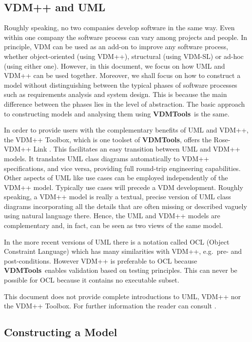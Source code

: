 \documentclass[\pformat,12pt,twoside]{article}
\newcommand{\vdmtools}{\textbf{VDMTools}}
\begin{document}
\subsection{VDM++ and UML}

Roughly speaking, no two companies develop software in the same 
way. Even within one company the software process can vary among 
projects and people. In principle, VDM can be used as an add-on 
to improve any software process, whether object-oriented (using 
VDM++), structural (using VDM-SL) or ad-hoc (using either one). 
However, in this document, we focus on how UML and VDM++ can 
be used together. Moreover, we shall focus on how to construct 
a model without distinguishing between the typical phases of 
software processes such as requirements analysis and system design. 
This is because the main difference between the phases lies in 
the level of abstraction. The basic approach to constructing 
models and analysing them using \vdmtools\ is the same.

In order to provide users with the complementary benefits of 
UML and VDM++, the VDM++ Toolbox, which is one toolset of \vdmtools, 
offers the Rose-VDM++ Link \cite{UMLMan-CSK}. This facilitates an easy transition 
between UML and VDM++ models. It translates UML class diagrams 
automatically to VDM++ specifications, and vice versa, providing 
full round-trip engineering capabilities. Other aspects of UML 
like use cases can be employed independently of the VDM++ model. 
Typically use cases will precede a VDM development. Roughly speaking, 
a VDM++ model is really a textual, precise version of UML class 
diagrams incorporating all the details that are often missing 
or described vaguely using natural language there. Hence, the 
UML and VDM++ models are complementary and, in fact, can be seen 
as two views of the same model. 

In the more recent versions of UML there is a notation called OCL
(Object Constraint Language) which has many similarities with VDM++,
e.g.\ pre- and post-conditions. However VDM++ is preferable to OCL
because \vdmtools\ enables validation based on testing
principles. This can never be possible for OCL because it contains no
executable subset.

This document does not provide complete introductions to UML, 
VDM++ nor the VDM++ Toolbox. For further information the reader 
can consult \cite{Booch&99,LangManPP-CSK,UserManPP-CSK}.

\subsection{Constructing a Model}
\end{document}
